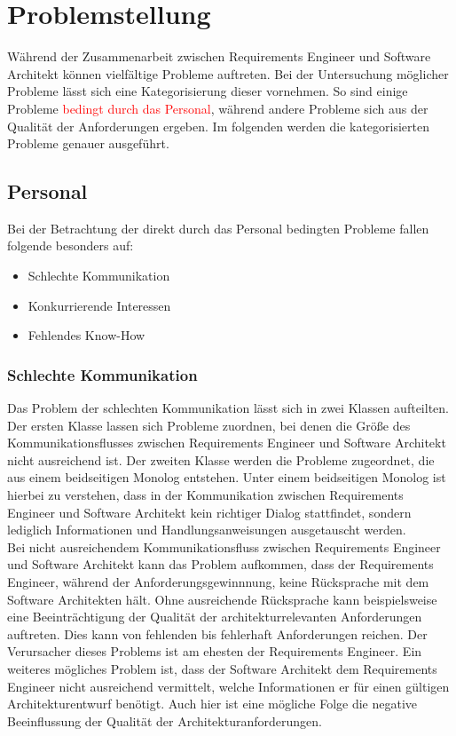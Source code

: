 \section{Problemstellung}
Während der Zusammenarbeit zwischen Requirements Engineer und Software Architekt können vielfältige Probleme auftreten. Bei der Untersuchung möglicher Probleme lässt sich eine Kategorisierung dieser vornehmen. So sind einige Probleme \textcolor{red}{bedingt durch das Personal}, während andere Probleme sich aus der Qualität der Anforderungen ergeben. Im folgenden werden die kategorisierten Probleme genauer ausgeführt.

\subsection{Personal}
Bei der Betrachtung der direkt durch das Personal bedingten Probleme fallen folgende besonders auf:
\begin{itemize} 
\item Schlechte Kommunikation
\item Konkurrierende Interessen
\item Fehlendes Know-How
\end{itemize}

\subsubsection{Schlechte Kommunikation}
Das Problem der schlechten Kommunikation lässt sich in zwei Klassen aufteilten. Der ersten Klasse lassen sich Probleme zuordnen, bei denen die Größe des Kommunikationsflusses zwischen Requirements Engineer und Software Architekt nicht ausreichend ist. Der zweiten Klasse werden die Probleme zugeordnet, die aus einem beidseitigen Monolog entstehen. Unter einem beidseitigen Monolog ist hierbei zu verstehen, dass in der Kommunikation zwischen Requirements Engineer und Software Architekt kein richtiger Dialog stattfindet, sondern lediglich Informationen und Handlungsanweisungen ausgetauscht werden. \\

Bei nicht ausreichendem Kommunikationsfluss zwischen Requirements Engineer und Software Architekt kann das Problem aufkommen, dass der Requirements Engineer, während der Anforderungsgewinnnung, keine Rücksprache mit dem Software Architekten hält. Ohne ausreichende Rücksprache kann beispielsweise eine Beeinträchtigung der Qualität der architekturrelevanten Anforderungen auftreten. Dies kann von fehlenden bis fehlerhaft Anforderungen reichen. Der Verursacher dieses Problems ist am ehesten der Requirements Engineer. Ein weiteres mögliches Problem ist, dass der Software Architekt dem Requirements Engineer nicht ausreichend vermittelt, welche Informationen er für einen gültigen Architekturentwurf benötigt. Auch hier ist eine mögliche Folge die negative Beeinflussung der Qualität der Architekturanforderungen.\\

